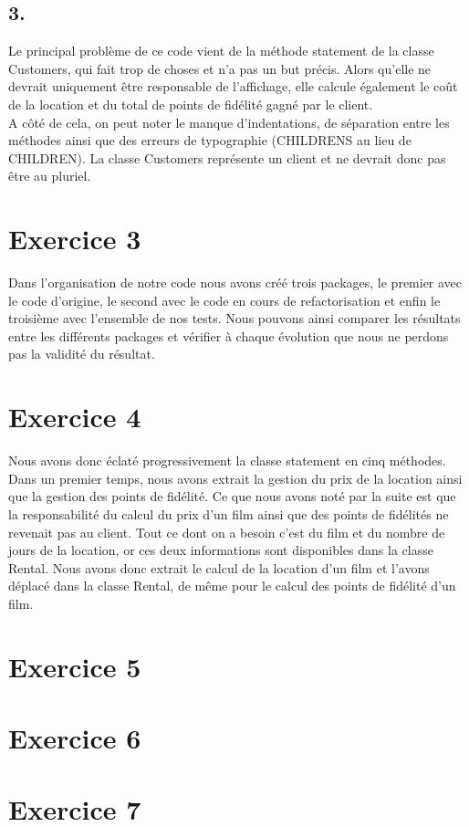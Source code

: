 \documentclass[%
a4paper,
11pt
]{article}
\begin{document}
\subsection*{3.}
Le principal problème de ce code vient de la méthode statement de la classe Customers, qui fait trop de choses et n'a pas un but précis. Alors qu'elle ne devrait uniquement être responsable de l'affichage, elle calcule également le coût de la location et du total de points de fidélité gagné par le client.\\ A côté de cela, on peut noter le manque d'indentations, de séparation entre les méthodes ainsi que des erreurs de typographie (CHILDRENS au lieu de CHILDREN). La classe Customers   représente un client et ne devrait donc pas être au pluriel.

\section*{Exercice 3}

Dans l'organisation de notre code nous avons créé trois packages, le premier avec le code d'origine, le second avec le code en cours de refactorisation et enfin le troisième avec l'ensemble de nos tests. Nous pouvons ainsi comparer les résultats entre les différents packages et vérifier à chaque évolution que nous ne perdons pas la validité du résultat.

\section*{Exercice 4}

Nous avons donc éclaté progressivement la classe statement en cinq méthodes. Dans un premier temps, nous avons extrait la gestion du prix de la location ainsi que la gestion des points de fidélité. Ce que nous avons noté par la suite est que la responsabilité du calcul du prix d'un film ainsi que des points de fidélités ne revenait pas au client. Tout ce dont on a besoin c'est du film et du nombre de jours de la location, or ces deux informations sont disponibles dans la classe Rental. Nous avons donc extrait le calcul de la location d'un film et l'avons déplacé dans la classe Rental, de même pour le calcul des points de fidélité d'un film.


\section*{Exercice 5}


\section*{Exercice 6}
\section*{Exercice 7}
\end{document}
